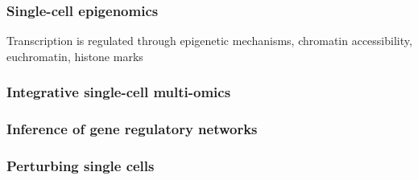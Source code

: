 




\subsubsection{Single-cell epigenomics}

Transcription is regulated through epigenetic mechanisms, chromatin accessibility, euchromatin, histone marks



\subsubsection{Integrative single-cell multi-omics}


\subsubsection{Inference of gene regulatory networks}


\subsubsection{Perturbing single cells}





